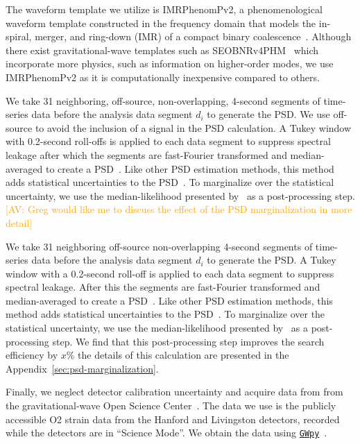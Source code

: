 \documentclass[%
 nofootinbib,
 amsmath,amssymb,
 aps,
 twocolumn
]{revtex4-2}
\newcommand{\gwpy}{{\sc \href{https://gwpy.github.io/}{\texttt{GWpy}}}\xspace}
\newcommand{\imrphenomp}{{\sc IMRPhenomPv2}\xspace}
\newcommand{\seob}{{\sc SEOBNRv4PHM}\xspace}
\newcommand{\avi}[1]{\textcolor{orange}{[AV: #1]}}
\begin{document}
The waveform template we utilize is \imrphenomp, a phenomenological waveform template constructed in the frequency domain that models the in-spiral, merger, and ring-down (IMR) of a compact binary coalescence~\citep{khan2016frequency}. Although there exist gravitational-wave templates such as \seob~\cite{seobnrv4phm} which incorporate more physics, such as information on higher-order modes, we use \imrphenomp as it is computationally inexpensive compared to others.

We take 31 neighboring, off-source, non-overlapping,  4-second  segments of time-series data before the analysis data segment $d_i$ to generate the PSD. We use off-source to avoid the inclusion of a signal in the PSD calculation. A Tukey window with 0.2-second roll-offs is applied to each data segment to suppress spectral leakage after which the segments are fast-Fourier transformed and median-averaged to create a PSD~\cite{ligo_psd}. Like other PSD estimation methods, this method adds statistical uncertainties to the PSD~\cite{psd_student_t, chatziioannou2019noise}. To marginalize over the statistical uncertainty, we use the median-likelihood presented by~\citet{psd_student_t} as a post-processing step. 
\avi{Greg would like me to discuss the effect of the PSD marginalization in more detail}


We take 31 neighboring off-source non-overlapping  4-second  segments of time-series data before the analysis data segment $d_i$ to generate the PSD.  A Tukey window with a 0.2-second roll-off is applied to each data segment to suppress spectral leakage. After this  the segments are fast-Fourier transformed and median-averaged to create a PSD~\cite{ligo_psd}. Like other PSD estimation methods, this method adds statistical uncertainties to the PSD~\cite{psd_student_t, chatziioannou2019noise, Biscoveanu:2020:PhRvD}. To marginalize over the statistical uncertainty, we use the median-likelihood presented by~\citet{psd_student_t} as a post-processing step. We find that this post-processing step improves the search efficiency by $x\%$ the details of this calculation are presented in the Appendix~\ref{sec:psd-marginalization}.

Finally, we neglect detector calibration uncertainty and acquire data from from the gravitational-wave Open Science Center~\cite{GWOSC}. The data we use is the publicly accessible O2 strain data from the Hanford and Livingston detectors, recorded while the detectors are in ``Science Mode''. We obtain the data using \gwpy~\cite{gwpy}. 
\end{document}
